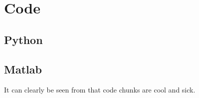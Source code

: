 \section{Code}

\subsection{Python}
    
\newpage

\subsection{Matlab}
    
    It can clearly be seen from  that code chunks are cool and sick.


    
    
